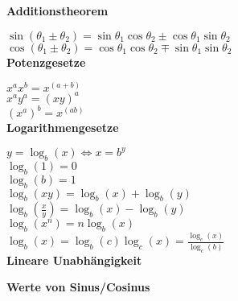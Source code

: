 \documentclass[10pt,twocolumn,a4paper]{article}
\begin{document}
\begin{flushleft}
\textbf{Additionstheorem}

$\sin \left( {\theta _1  \pm \theta _2 } \right) = \sin \theta _1 \cos \theta _2  \pm \cos \theta _1 \sin \theta _2$\\
$\cos \left( {\theta _1  \pm \theta _2 } \right) = \cos \theta _1 \cos \theta _2  \mp \sin \theta _1 \sin \theta _2$\\

\textbf{Potenzgesetze}

$x^a x^b  = x^{\left( {a + b} \right)}$\\
$x^a y^a  = \left( {xy} \right)^a$\\
$\left( {x^a } \right)^b  = x^{\left( {ab} \right)}$\\

\textbf{Logarithmengesetze}

$y = \log _b \left( x \right) \Leftrightarrow x = b^y$\\
$\log _b \left( 1 \right) = 0$\\
$\log _b \left( b \right) = 1$\\
$\log _b \left( {xy} \right) = \log _b \left( x \right) + \log _b \left( y \right)$\\
$\log _b \left( {\frac{x}{y}} \right) = \log _b \left( x \right) - \log _b \left( y \right)$\\
$\log _b \left( {x^n } \right) = n\log _b \left( x \right)$\\
$\log _b \left( x \right) = \log _b \left( c \right)\log _c \left( x \right) = \frac{{\log _c \left( x \right)}}{{\log _c \left( b \right)}}$\\

\textbf{Lineare Unabhängigkeit}

\textbf{Werte von Sinus/Cosinus}


\end{flushleft}
\end{document}
